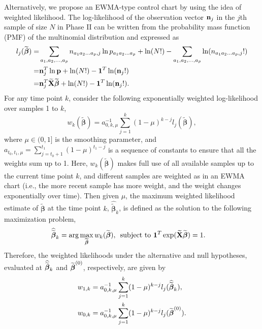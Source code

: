 Alternatively, we propose an EWMA-type control chart by using the idea of weighted
likelihood. The log-likelihood of the observation vector ${\bf n}_j$ in the $j$th
sample of size $N$ in Phase II can be written from the probability mass function
(PMF) of the multinomial distribution and expressed as
\begin{align*}
l_j(\widetilde{\boldsymbol\beta})=&\sum_{a_1,a_2,\ldots,a_p}n_{a_1a_2\ldots a_p,j}\ln
p_{a_1a_2\ldots a_p} + \ln(N!)-\sum_{a_1,a_2,\ldots,a_p}\ln(n_{a_1a_2\ldots
a_p,j}!)\nonumber\\
=&{\bf n}^T_j\ln{\bf p}+\ln(N!)-\boldsymbol 1^T\ln({\bf n}_j!)\nonumber\\
=&{\bf n}^T_j\widetilde{\bf X}\widetilde{\boldsymbol\beta}+\ln(N!)-\boldsymbol 1^T\ln({\bf
n}_j!).
\end{align*}
For any time point $k$, consider the following exponentially weighted log-likelihood
over samples 1 to $k$,
\begin{equation*}
w_k(\widetilde{\bm\beta})=
a_{0,k,\mu}^{-1}\sum_{j=1}^{k}(1-\mu)^{k-j}l_j(\widetilde{\bm\beta}),
\end{equation*}
where $\mu\in(0,1]$ is the smoothing parameter, and $
a_{t_0,t_1,\mu}=\sum_{j=t_0+1}^{t_1}(1-\mu)^{t_1-j}$ is a sequence of constants to
ensure that all the weights sum up to 1. Here, $w_k(\widetilde{\bm\beta})$ makes
full use of all available samples up to the current time point $k$, and different
samples are weighted as in an EWMA chart (i.e., the more recent sample has more
weight, and the weight changes exponentially over time). Then given $\mu$, the
maximum weighted likelihood estimate of $\widetilde{\bm\beta}$ at the time point
$k$, $\widehat{\widetilde{\bm\beta}}_k$, is defined as the solution to the following
maximization problem,
\begin{align}
\widehat{\widetilde{\bm\beta}}_k=\arg\max_{\widetilde{\bm\beta}}
w_k(\widetilde{\bm\beta}),\ \ &\mbox{subject to} \ \bm 1^T\exp(\widetilde{\bf
X}\widetilde{\bm\beta})=1.\label{F2.5}
\end{align}
Therefore, the weighted likelihoods under the alternative and null hypotheses,
evaluated at $\widehat{\widetilde{\boldsymbol\beta}}_k$ and $\widetilde{\boldsymbol\beta}^{(0)}$, respectively,
are given by
\begin{align*}
{w}_{1,k}&=a_{0,k,\mu}^{-1}\sum_{j=1}^{k}(1-\mu)^{k-j}l_j(\widehat{\widetilde{\boldsymbol\beta}}_k),\\
{w}_{0,k}&=a_{0,k,\mu}^{-1}\sum_{j=1}^{k}(1-\mu)^{k-j}l_j({\widetilde{\boldsymbol\beta}}^{(0)}).
\end{align*}
